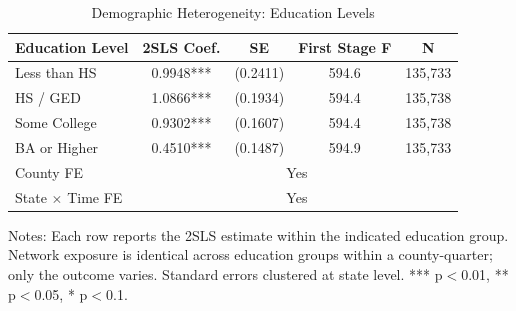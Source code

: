 \begin{table}[H]
\centering
\caption{Demographic Heterogeneity: Education Levels}
\label{tab:eduhet}
\small
\begin{tabular}{l cccc}
\toprule
Education Level & 2SLS Coef. & SE & First Stage F & N \\
\midrule
Less than HS & 0.9948*** & (0.2411) & 594.6 & 135,733 \\
HS / GED & 1.0866*** & (0.1934) & 594.4 & 135,738 \\
Some College & 0.9302*** & (0.1607) & 594.4 & 135,738 \\
BA or Higher & 0.4510*** & (0.1487) & 594.9 & 135,733 \\
\midrule
County FE & \multicolumn{4}{c}{Yes} \\
State $\times$ Time FE & \multicolumn{4}{c}{Yes} \\
\bottomrule
\end{tabular}
\begin{figurenotes}
Notes: Each row reports the 2SLS estimate within the indicated education group. 
Network exposure is identical across education groups within a county-quarter; 
only the outcome varies. Standard errors clustered at state level. 
*** p$<$0.01, ** p$<$0.05, * p$<$0.1.
\end{figurenotes}
\end{table}
